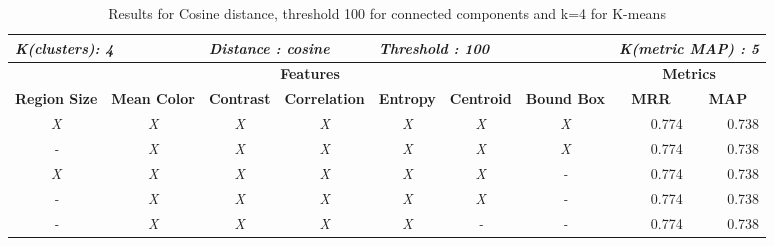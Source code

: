 \begin{table}[H]
\centering
\begin{tabular}{|c|c|c|c|c|c|c|r|r|}
\hline
\multicolumn{2}{|l|}{\textit{\textbf{K(clusters): 4}}} & \multicolumn{2}{l|}{\textit{\textbf{Distance : cosine}}} & \multicolumn{3}{l|}{\textit{\textbf{Threshold : 100}}} & \multicolumn{2}{l|}{\textit{\textbf{K(metric MAP) :  5}}} \\ \hline
\multicolumn{7}{|c|}{\textbf{Features}} & \multicolumn{2}{c|}{\textbf{Metrics}} \\ \hline
\textbf{Region Size} & \textbf{Mean Color} & \textbf{Contrast} & \textbf{Correlation} & \textbf{Entropy} & \textbf{Centroid} & \textbf{Bound Box} & \multicolumn{1}{c|}{\textbf{MRR}} & \multicolumn{1}{c|}{\textbf{MAP}} \\ \hline
\textit{X} & \textit{X} & \textit{X} & \textit{X} & \textit{X} & \textit{X} & \textit{X} & 0.774 & 0.738 \\ \hline
\textit{-} & \textit{X} & \textit{X} & \textit{X} & \textit{X} & \textit{X} & \textit{X} & 0.774 & 0.738 \\ \hline
\textit{X} & \textit{X} & \textit{X} & \textit{X} & \textit{X} & \textit{X} & \textit{-} & 0.774 & 0.738 \\ \hline
\textit{-} & \textit{X} & \textit{X} & \textit{X} & \textit{X} & \textit{X} & \textit{-} & 0.774 & 0.738 \\ \hline
\textit{-} & \textit{X} & \textit{X} & \textit{X} & \textit{X} & \textit{-} & \textit{-} & 0.774 & 0.738 \\ \hline
\end{tabular}
\caption{Results for Cosine distance, threshold 100 for connected components and k=4 for K-means}
\label{table:results02}
\end{table}


